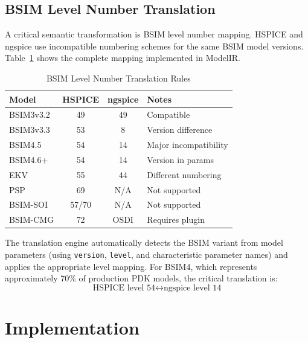 \documentclass[conference]{IEEEtran}
\begin{document}
\subsection{BSIM Level Number Translation}
\label{sec:level_mapping}

A critical semantic transformation is BSIM level number mapping. HSPICE and ngspice use incompatible numbering schemes for the same BSIM model versions. Table~\ref{tab:level_mapping} shows the complete mapping implemented in ModelIR.

\begin{table}[!t]
\caption{BSIM Level Number Translation Rules}
\label{tab:level_mapping}
\centering
\renewcommand{\arraystretch}{1.15}
\begin{tabular}{@{}lccl@{}}
\toprule
\textbf{Model} & \textbf{HSPICE} & \textbf{ngspice} & \textbf{Notes} \\
\midrule
BSIM3v3.2 & 49 & 49 & Compatible \\
BSIM3v3.3 & 53 & 8 & Version difference \\
BSIM4.5 & 54 & 14 & Major incompatibility \\
BSIM4.6+ & 54 & 14 & Version in params \\
EKV & 55 & 44 & Different numbering \\
PSP & 69 & N/A & Not supported \\
BSIM-SOI & 57/70 & N/A & Not supported \\
BSIM-CMG & 72 & OSDI & Requires plugin \\
\bottomrule
\end{tabular}
\end{table}

The translation engine automatically detects the BSIM variant from model parameters (using \texttt{version}, \texttt{level}, and characteristic parameter names) and applies the appropriate level mapping. For BSIM4, which represents approximately 70\% of production PDK models, the critical translation is:
\begin{equation}
\text{HSPICE level 54} \leftrightarrow \text{ngspice level 14}
\end{equation}

\section{Implementation}
\label{sec:implementation}
\end{document}
